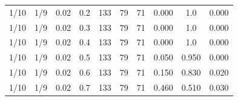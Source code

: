 \documentclass[specialist, substylefile = spbu.rtx,
			   subf, href, 12pt]{disser}
\begin{document}
\begin{table}[!hhh]
\begin{tabular}{cccccccccc}
		1/10 &     1/9 &        0.02 &     0.2 & 133 & 79 & 71 & 0.000 & 1.0 & 0.000 \\
		1/10 &     1/9 &        0.02 &     0.3 & 133 & 79 & 71 & 0.000 & 1.0 & 0.000 \\
		1/10 &     1/9 &        0.02 &     0.4 & 133 & 79 & 71 & 0.000 & 1.0 & 0.000 \\
		1/10 &     1/9 &        0.02 &     0.5 & 133 & 79 & 71 & 0.050 & 0.950 & 0.000 \\
		1/10 &     1/9 &        0.02 &     0.6 & 133 & 79 & 71 & 0.150 & 0.830 & 0.020 \\
		1/10 &     1/9 &        0.02 &     0.7 & 133 & 79 & 71 & 0.460 & 0.510 & 0.030 \\
		\bottomrule
	\end{tabular}
	\label{tab:simplified_system_results_k=15_2}
\end{table}
\end{document}
